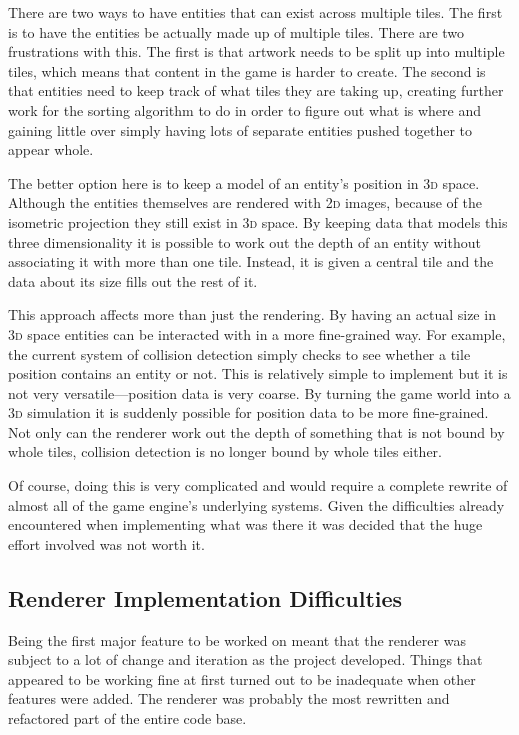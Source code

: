 There are two ways to have entities that can exist across multiple tiles. The first is to have the entities be actually made up of multiple tiles. There are two frustrations with this. The first is that artwork needs to be split up into multiple tiles, which means that content in the game is harder to create. The second is that entities need to keep track of what tiles they are taking up, creating further work for the sorting algorithm to do in order to figure out what is where and gaining little over simply having lots of separate entities pushed together to appear whole.

The better option here is to keep a model of an entity's position in \textsc{3d} space. Although the entities themselves are rendered with \textsc{2d} images, because of the isometric projection they still exist in \textsc{3d} space. By keeping data that models this three dimensionality it is possible to work out the depth of an entity without associating it with more than one tile. Instead, it is given a central tile and the data about its size fills out the rest of it.

This approach affects more than just the rendering. By having an actual size in \textsc{3d} space entities can be interacted with in a more fine-grained way. For example, the current system of collision detection simply checks to see whether a tile position contains an entity or not. This is relatively simple to implement but it is not very versatile---position data is very coarse. By turning the game world into a \textsc{3d} simulation it is suddenly possible for position data to be more fine-grained. Not only can the renderer work out the depth of something that is not bound by whole tiles, collision detection is no longer bound by whole tiles either.

Of course, doing this is very complicated and would require a complete rewrite of almost all of the game engine's underlying systems. Given the difficulties already encountered when implementing what was there it was decided that the huge effort involved was not worth it.

\subsection{Renderer Implementation Difficulties}
Being the first major feature to be worked on meant that the renderer was subject to a lot of change and iteration as the project developed. Things that appeared to be working fine at first turned out to be inadequate when other features were added. The renderer was probably the most rewritten and refactored part of the entire code base.

